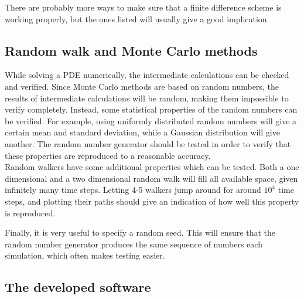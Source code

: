 \noindent There are probably more ways to make sure that a finite difference scheme is working properly, but the ones listed will usually give a good implication.

\subsection{Random walk and Monte Carlo methods}

While solving a PDE numerically, the intermediate calculations can be checked and verified. 
Since Monte Carlo methods are based on random numbers, the results of intermediate calculations will be random, making them impossible to verify completely. 
Instead, some statistical properties of the random numbers can be verified. 
For example, using uniformly distributed random numbers will give a certain mean and standard deviation, while a Gaussian distribution will give another.
The random number generator should be tested in order to verify that these properties are reproduced to a reasonable accuracy. \\

Random walkers have some additional properties which can be tested. 
Both a one dimensional and a two dimensional random walk will fill all available space, given infinitely many time steps. 
Letting 4-5 walkers jump around for around $10^4$ time steps, and plotting their paths should give an indication of how well this property is reproduced. 

Finally, it is very useful to specify a random seed. This will ensure that the random number generator produces the same sequence of numbers each simulation, which often makes testing easier. 
% 

\subsection{The developed software}

